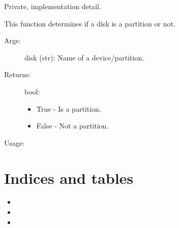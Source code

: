 \documentclass[letterpaper,10pt,english]{sphinxmanual}
\begin{document}
\begin{fulllineitems}
\label{\detokenize{macos:getdevinfo.macos.is_partition}}
Private, implementation detail.

This function determines if a disk is a partition or not.
\begin{description}
\item[{Args:}] \leavevmode
disk (str):   Name of a device/partition.

\item[{Returns:}] \leavevmode
bool:
\begin{itemize}
\item {} 
True  - Is a partition.

\item {} 
False - Not a partition.

\end{itemize}

\end{description}

Usage:

\begin{sphinxVerbatim}[commandchars=\\\{\}]
  
\end{sphinxVerbatim}

\end{fulllineitems}



\chapter{Indices and tables}
\label{\detokenize{index:indices-and-tables}}\begin{itemize}
\item {} 

\item {} 

\item {} 

\end{itemize}
\end{document}
